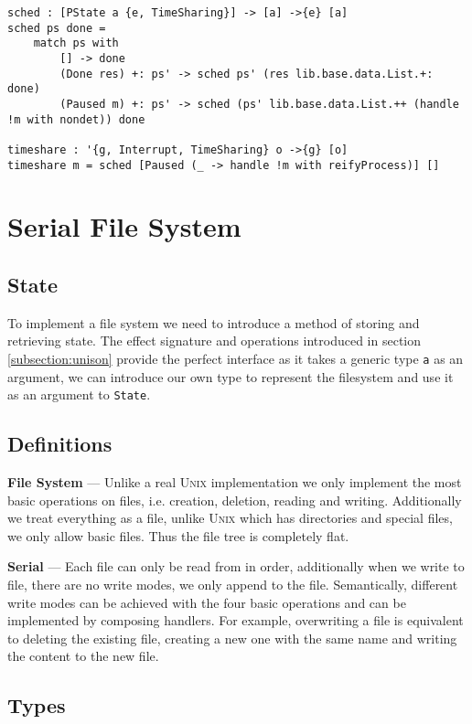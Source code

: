 \documentclass[logo,bsc,singlespacing,parskip]{infthesis}
\begin{document}
\begin{lstlisting}[language=unison]
sched : [PState a {e, TimeSharing}] -> [a] ->{e} [a]
sched ps done = 
    match ps with
        [] -> done
        (Done res) +: ps' -> sched ps' (res lib.base.data.List.+: done)
        (Paused m) +: ps' -> sched (ps' lib.base.data.List.++ (handle !m with nondet)) done

timeshare : '{g, Interrupt, TimeSharing} o ->{g} [o]
timeshare m = sched [Paused (_ -> handle !m with reifyProcess)] []
\end{lstlisting}

\section{Serial File System}
\label{sec:filesystem}

\subsection{State}

To implement a file system we need to introduce a method of storing and
retrieving state. The effect signature and operations introduced in section
\ref{subsection:unison} provide the perfect interface as it takes a generic
type \texttt{a} as an argument, we can introduce our own type to represent the
filesystem and use it as an argument to \texttt{State}.

\subsection{Definitions}

\textbf{File System} ---
Unlike a real \textsc{Unix} implementation we only implement the most basic
operations on files, i.e. creation, deletion, reading and writing. Additionally
we treat everything as a file, unlike \textsc{Unix} which has directories and
special files, we only allow basic files. Thus the file tree is completely flat.

\textbf{Serial} --- Each file can only be read from in order, additionally when
we write to file, there are no write modes, we only append to the file.
Semantically, different write modes can be achieved with the four basic
operations and can be implemented by composing handlers. For example,
overwriting a file is equivalent to deleting the existing file, creating a new
one with the same name and writing the content to the new file.

\subsection{Types}
\label{sec:filesystemtypes}
\end{document}
